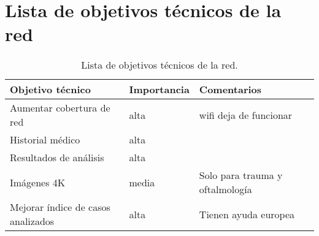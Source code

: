 \section{Lista de objetivos técnicos de la red}

\begin{table}[H]
	\begin{center}
		\begin{tabular}{|l|l|l|}
			\hline 
			Objetivo técnico & Importancia & Comentarios \\ 
			\hline \hline
			Aumentar cobertura de red & alta & wifi deja de funcionar \\ \hline
			Historial médico & alta & \\ \hline
			Resultados de análisis & alta & \\ \hline
			Imágenes 4K & media & Solo para trauma y oftalmología \\ \hline	
			Mejorar índice de casos analizados & alta & Tienen ayuda europea \\ \hline	
		\end{tabular}
		\caption{Lista de objetivos técnicos de la red.}
		\label{tabla:tabla4}
	\end{center}
\end{table}

%
%

       
